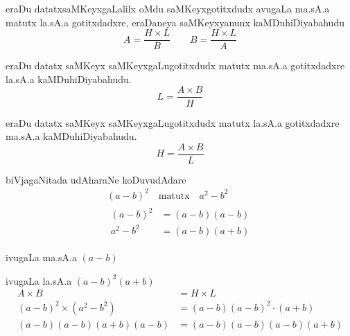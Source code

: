 eraDu datatxsaMKeyxgaLalilx oMdu saMKeyxgotitxdudx avugaLa ma.sA.a matutx la.sA.a gotitxdadxre, eraDaneya saMKeyxyanunx kaMDuhiDiyabahudu
$$
A= \frac{H \times L}{B} \qquad  B= \frac{H \times L}{A}
$$

eraDu datatx saMKeyx saMKeyxgaLugotitxdudx matutx ma.sA.a gotitxdadxre la.sA.a kaMDuhiDiyabahudu.
$$
L=\frac{A\times B}{H}
$$

eraDu datatx saMKeyx saMKeyxgaLugotitxdudx matutx la.sA.a gotitxdadxre ma.sA.a kaMDuhiDiyabahudu.
$$
H=\frac{A\times B}{L}
$$

biVjagaNitada udAharaNe koDuvudAdare
\begin{gather*}
(a-b)^2 \quad\text{matutx}\quad a^{2}-b^{2}\\
\begin{split}
(a-b)^2 &= (a-b)(a-b)\\
a^2-b^2 &= (a-b)(a+b)
\end{split}
\end{gather*}

ivugaLa ma.sA.a $(a-b)$

ivugaLa la.sA.a $(a-b)^2(a+b)$
\begin{align*}
A\times B &= H\times L\\
(a-b)^2 \times (a^2-b^2) &= (a-b)(a-b)^2\cdot(a+b)\\
(a-b)(a-b)(a+b)(a-b) &= (a-b)(a-b)(a-b)(a+b)
\end{align*}
